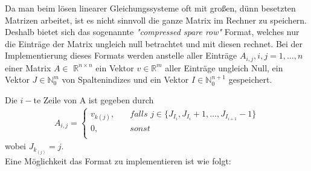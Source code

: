 \documentclass[12pt,a4paper]{scrartcl}
\numberwithin{equation}{section}
\numberwithin{myalgctr}{section}
\numberwithin{mytheoremctr}{subsection}
\numberwithin{mykorollarctr}{subsection}
\numberwithin{mylemmactr}{subsection}
\numberwithin{mybeispielctr}{subsection}
\begin{document}
	\newpage
	
	Da man beim lösen linearer Gleichungssysteme oft mit großen, dünn besetzten Matrizen arbeitet, ist es nicht sinnvoll die ganze Matrix im Rechner zu speichern. Deshalb bietet sich das sogenannte \textit{"compressed spare row"} Format, welches nur die Einträge der Matrix ungleich null betrachtet und mit diesen rechnet. Bei der Implementierung dieses Formats werden anstelle aller Einträge $A_{i,j}, i,j = 1,\ldots,n$ einer Matrix $A\in$ $\mathbb{R}^{n\times n}$ ein Vektor $v\in\mathbb{R}^{m}$ aller Einträge ungleich Null, ein Vektor $J\in\mathbb{N}_0^{m}$ von Spaltenindizes und ein Vektor $I\in\mathbb{N}_0^{n+1}$ gespeichert.
	
	Die $i-$te Zeile von A ist gegeben durch
	\begin{align*}
		A_{i,j} = 
		\begin{cases}
			\textit{$v_{k(j)}$},&\quad\textit{falls $j \in \{J_{I_i}, J_{I_{i}} + 1, \ldots, J_{I_{i+1}} - 1$}\}\\
			\textit{0},&\quad\textit{sonst}\\
		\end{cases}
	\end{align*} 
	wobei $J_{k_{(j)}} = j$.\\
	
	Eine Möglichkeit das Format zu implementieren ist wie folgt:
	
\end{document}
